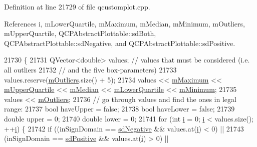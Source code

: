 Definition at line 21729 of file qcustomplot.\+cpp.



References i, m\+Lower\+Quartile, m\+Maximum, m\+Median, m\+Minimum, m\+Outliers, m\+Upper\+Quartile, Q\+C\+P\+Abstract\+Plottable\+::sd\+Both, Q\+C\+P\+Abstract\+Plottable\+::sd\+Negative, and Q\+C\+P\+Abstract\+Plottable\+::sd\+Positive.


\begin{DoxyCode}
21730                                                                          \{
21731   QVector<double> values; \textcolor{comment}{// values that must be considered (i.e. all outliers}
21732                           \textcolor{comment}{// and the five box-parameters)}
21733   values.reserve(\hyperlink{class_q_c_p_statistical_box_a415e2f77a89396c2af999afe027bdf6c}{mOutliers}.size() + 5);
21734   values << \hyperlink{class_q_c_p_statistical_box_a16266f1e0e4e8e95b5d141c49479ef2e}{mMaximum} << \hyperlink{class_q_c_p_statistical_box_a865afbcca332ee851aa45807381bc80e}{mUpperQuartile} << \hyperlink{class_q_c_p_statistical_box_ae43287ca13c8166bde2ac19bf0969d23}{mMedian} << 
      \hyperlink{class_q_c_p_statistical_box_acac86cac93d9fa3d820b5aaa04ed96f6}{mLowerQuartile} << \hyperlink{class_q_c_p_statistical_box_a7143ece4e7e5f9ac010739fbc390bf0c}{mMinimum};
21735   values << \hyperlink{class_q_c_p_statistical_box_a415e2f77a89396c2af999afe027bdf6c}{mOutliers};
21736   \textcolor{comment}{// go through values and find the ones in legal range:}
21737   \textcolor{keywordtype}{bool} haveUpper = \textcolor{keyword}{false};
21738   \textcolor{keywordtype}{bool} haveLower = \textcolor{keyword}{false};
21739   \textcolor{keywordtype}{double} upper = 0;
21740   \textcolor{keywordtype}{double} lower = 0;
21741   \textcolor{keywordflow}{for} (\textcolor{keywordtype}{int} \hyperlink{_comparision_pictures_2_createtest_image_8m_a6f6ccfcf58b31cb6412107d9d5281426}{i} = 0; \hyperlink{_comparision_pictures_2_createtest_image_8m_a6f6ccfcf58b31cb6412107d9d5281426}{i} < values.size(); ++\hyperlink{_comparision_pictures_2_createtest_image_8m_a6f6ccfcf58b31cb6412107d9d5281426}{i}) \{
21742     \textcolor{keywordflow}{if} ((inSignDomain == \hyperlink{class_q_c_p_abstract_plottable_a661743478a1d3c09d28ec2711d7653d8a0fc9a70796ef60ad18ddd18056e6dc63}{sdNegative} && values.at(\hyperlink{_comparision_pictures_2_createtest_image_8m_a6f6ccfcf58b31cb6412107d9d5281426}{i}) < 0) ||
21743         (inSignDomain == \hyperlink{class_q_c_p_abstract_plottable_a661743478a1d3c09d28ec2711d7653d8a02951859f243a4d24e779cfbb5471030}{sdPositive} && values.at(\hyperlink{_comparision_pictures_2_createtest_image_8m_a6f6ccfcf58b31cb6412107d9d5281426}{i}) > 0) ||

\end{DoxyCode}

